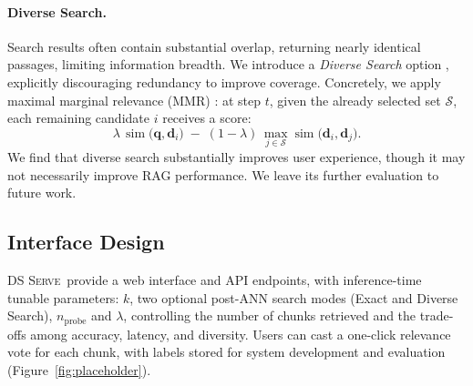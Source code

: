 \documentclass[letterpaper]{article} %
\newcommand{\sys}{\textsc{DS Serve\xspace}}%
\newcommand{\sewon}[1]{{\color{purple!70}[sewon: #1]}}
\newcommand{\yichuan}[1]{{\color{blue}[yichuan: #1]}}
\newcommand{\sewon}[1]{}
\newcommand{\yichuan}[1]{}
\begin{document}
\vspace{-.3em}
\paragraph{Diverse Search.}
Search results often contain substantial overlap, returning nearly identical passages, limiting information breadth. We introduce a \emph{Diverse Search} option 
, explicitly discouraging redundancy to improve coverage. Concretely, we apply maximal marginal relevance  (MMR) \cite{mmr}: at step $t$, given the already selected set $\mathcal{S}$, each remaining candidate $i$ receives a score:$$\lambda\, \operatorname{sim}\!\bigl(\mathbf{q},\mathbf{d}_i\bigr) \;-\; (1-\lambda)\,\max_{j\in\mathcal{S}} \operatorname{sim}\!\bigl(\mathbf{d}_i,\mathbf{d}_j\bigr).$$ We find that diverse search substantially improves user experience, though it may not necessarily improve RAG performance. We leave its further evaluation to future work.


\subsection{Interface Design}

\sys\ provide a web interface and API endpoints, with inference-time tunable parameters: $k$, two optional post-ANN search modes (Exact and Diverse Search), $n_\text{probe}$ and $\lambda$, controlling the number of chunks retrieved and the trade-offs among accuracy, latency, and diversity.
Users can cast a one-click relevance vote for each chunk, with labels stored for system development and evaluation (Figure~\ref{fig:placeholder}).

\end{document}
